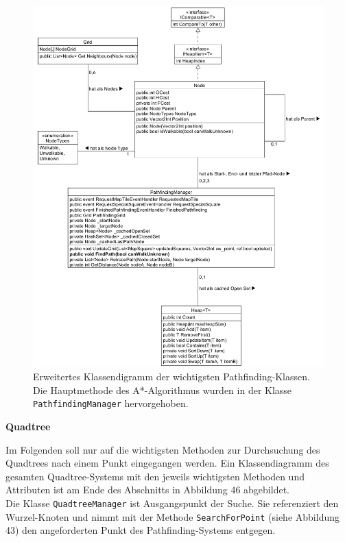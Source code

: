 \documentclass[a4paper,12pt]{article}
\newcommand{\code}{\texttt}
\begin{document}
\begin{figure}[H]
    \centering
    \includegraphics[width=1\linewidth]{Bilder/Aufgabe3/Teilaufgabe_C/Klassendiagramm_Pathfinding.png}
    \caption{Erweitertes Klassendigramm der wichtigsten Pathfinding-Klassen. Die Hauptmethode des A*-Algorithmus wurden in der Klasse \code{PathfindingManager} hervorgehoben.}
\end{figure}

\textbf{Quadtree}

Im Folgenden soll nur auf die wichtigsten Methoden zur Durchsuchung des Quadtrees nach einem Punkt eingegangen werden. Ein Klassendiagramm des gesamten Quadtree-Systems mit den jeweils wichtigsten Methoden und Attributen ist am Ende des Abschnitts in Abbildung 46 abgebildet.
\\[0.4cm]
Die Klasse \code{QuadtreeManager} ist Ausgangspunkt der Suche. Sie referenziert den Wurzel-Knoten und nimmt mit der Methode \code{SearchForPoint} (siehe Abbildung 43) den angeforderten Punkt des Pathfinding-Systems entgegen.
\end{document}

